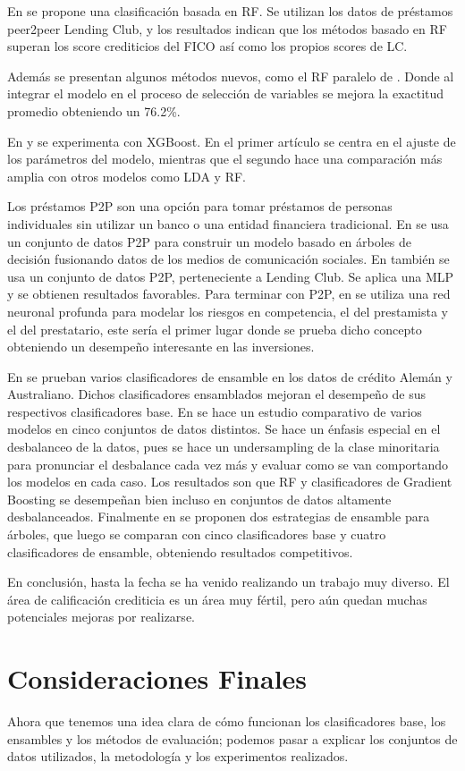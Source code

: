 En \cite{malekipirbazari2015risk} se propone una clasificación basada en \ac{RF}. Se utilizan los datos de préstamos peer2peer Lending Club, y los resultados indican que los métodos basado en \ac{RF} superan los score crediticios del FICO así como los propios scores de LC.

Además se presentan algunos métodos nuevos, como el \ac{RF} paralelo de \cite{van2016novel}. Donde al integrar el modelo en el proceso de selección de variables se mejora la exactitud promedio obteniendo un 76.2\%.

En \cite{xia2017boosted} y \cite{bhatia2017credit} se experimenta con \ac{XGBoost}. En el primer artículo se centra en el ajuste de los parámetros del modelo, mientras que el segundo hace una comparación más amplia con otros modelos como \ac{LDA} y \ac{RF}.

Los préstamos \ac{P2P} son una opción para tomar préstamos de personas individuales sin utilizar un banco o una entidad financiera tradicional. En \cite{zhang2016research} se usa un conjunto de datos \ac{P2P} para construir un modelo basado en árboles de decisión fusionando datos de los medios de comunicación sociales. En \cite{zang2014credit} también se usa un conjunto de datos \ac{P2P}, perteneciente a Lending Club. Se aplica una \ac{MLP} y se obtienen resultados favorables. Para terminar con \ac{P2P}, en \cite{tan2018deep} se utiliza una red neuronal profunda para modelar los riesgos en competencia, el del prestamista y el del prestatario, este sería el primer lugar donde se prueba dicho concepto obteniendo un desempeño interesante en las inversiones.

En \cite{nanni2009experimental} se prueban varios clasificadores de ensamble en los datos de crédito Alemán y Australiano. Dichos clasificadores ensamblados mejoran el desempeño de sus respectivos clasificadores base. En \cite{brown2012experimental} se hace un estudio comparativo de varios modelos en cinco conjuntos de datos distintos. Se hace un énfasis especial en el desbalanceo de la datos, pues se hace un undersampling de la clase minoritaria para pronunciar el desbalance cada vez más y evaluar como se van comportando los modelos en cada caso. Los resultados son que \ac{RF} y clasificadores de Gradient Boosting se desempeñan bien incluso en conjuntos de datos altamente desbalanceados. Finalmente en \cite{wang2012two} se proponen dos estrategias de ensamble para árboles, que luego se comparan con cinco clasificadores base y cuatro clasificadores de ensamble, obteniendo resultados competitivos.

En conclusión, hasta la fecha se ha venido realizando un trabajo muy diverso. El área de calificación crediticia es un área muy fértil, pero aún quedan muchas potenciales mejoras por realizarse.

\section{Consideraciones Finales}

Ahora que tenemos una idea clara de cómo funcionan los clasificadores base, los ensambles y los métodos de evaluación; podemos pasar a explicar los conjuntos de datos utilizados, la metodología y los experimentos realizados.
